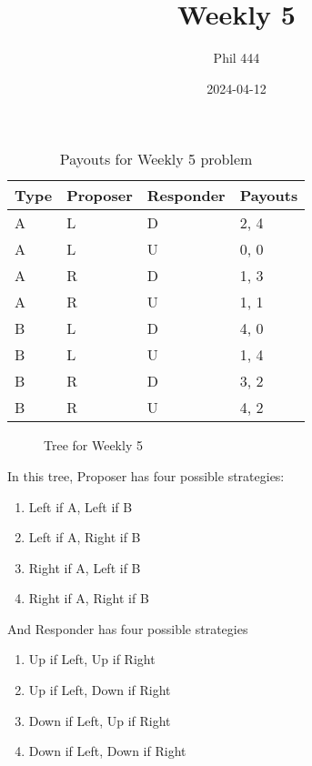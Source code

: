 \documentclass[
  12pt,
  letterpaper,
  DIV=11,
  numbers=noendperiod]{scrartcl}
\title{Weekly 5}
\author{Phil 444}
\date{2024-04-12}
\providecommand{\tightlist}{%
  \setlength{\itemsep}{0pt}\setlength{\parskip}{0pt}}\usepackage{longtable,booktabs,array}
\begin{document}
\maketitle

\begin{longtable}[]{@{}llll@{}}

\caption{\label{tbl-tree-payouts}Payouts for Weekly 5 problem}

\tabularnewline

\toprule\noalign{}
Type & Proposer & Responder & Payouts \\
\midrule\noalign{}
\endhead
\bottomrule\noalign{}
\endlastfoot
A & L & D & 2, 4 \\
A & L & U & 0, 0 \\
A & R & D & 1, 3 \\
A & R & U & 1, 1 \\
B & L & D & 4, 0 \\
B & L & U & 1, 4 \\
B & R & D & 3, 2 \\
B & R & U & 4, 2 \\

\end{longtable}

\begin{figure}


\caption{\label{fig-pbw11}Tree for Weekly 5}

\end{figure}%

\newpage

In this tree, Proposer has four possible strategies:

\begin{enumerate}
\def\labelenumi{\arabic{enumi}.}
\tightlist
\item
  Left if A, Left if B
\item
  Left if A, Right if B
\item
  Right if A, Left if B
\item
  Right if A, Right if B
\end{enumerate}

And Responder has four possible strategies

\begin{enumerate}
\def\labelenumi{\arabic{enumi}.}
\tightlist
\item
  Up if Left, Up if Right
\item
  Up if Left, Down if Right
\item
  Down if Left, Up if Right
\item
  Down if Left, Down if Right
\end{enumerate}
\end{document}
